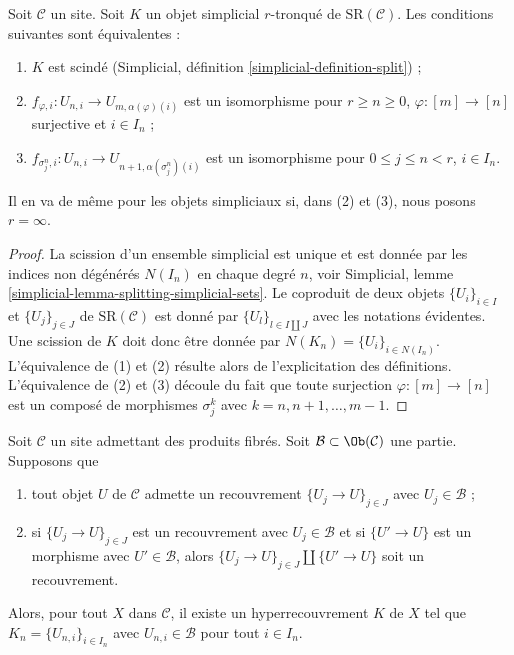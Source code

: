 \begin{lemma}
\label{lemma-split}
Soit $\mathcal{C}$ un site. Soit $K$ un objet simplicial $r$-tronqué
de $\text{SR}(\mathcal{C})$. Les conditions suivantes sont équivalentes :
\begin{enumerate}
\item $K$ est scindé (Simplicial, définition \ref{simplicial-definition-split}) ;
\item $f_{\varphi, i} : U_{n, i} \to U_{m, \alpha(\varphi)(i)}$
est un isomorphisme pour $r \geq n \geq 0$,
$\varphi : [m] \to [n]$ surjective et $i \in I_n$ ;
\item $f_{\sigma^n_j, i} : U_{n, i} \to U_{n + 1, \alpha(\sigma^n_j)(i)}$
est un isomorphisme pour $0 \leq j \leq n < r$, $i \in I_n$.
\end{enumerate}
Il en va de même pour les objets simpliciaux si, dans (2) et (3),
nous posons $r = \infty$.
\end{lemma}

\begin{proof}
La scission d'un ensemble simplicial est unique et est donnée par
les indices non dégénérés $N(I_n)$ en chaque degré $n$, voir
Simplicial, lemme \ref{simplicial-lemma-splitting-simplicial-sets}.
Le coproduit de deux objets $\{U_i\}_{i \in I}$ et $\{U_j\}_{j \in J}$
de $\text{SR}(\mathcal{C})$ est donné par $\{U_l\}_{l \in I \amalg J}$
avec les notations évidentes. Une scission de $K$ doit donc être donnée par
$N(K_n) = \{U_i\}_{i \in N(I_n)}$. L'équivalence de (1) et (2)
résulte alors de l'explicitation des définitions. L'équivalence de (2)
et (3) découle du fait que toute surjection
$\varphi : [m] \to [n]$ est un composé de morphismes
$\sigma^k_j$ avec $k = n, n + 1, \ldots, m - 1$.
\end{proof}

\begin{lemma}
\label{lemma-hypercovering-object}
Soit $\mathcal{C}$ un site admettant des produits fibrés.
Soit $\mathcal{B} \subset \Ob(\mathcal{C})$ une partie.
Supposons que
\begin{enumerate}
\item tout objet $U$ de $\mathcal{C}$ admette un recouvrement
$\{U_j \to U\}_{j \in J}$ avec $U_j \in \mathcal{B}$ ;
\item si $\{U_j \to U\}_{j \in J}$ est un recouvrement
avec $U_j \in \mathcal{B}$ et si $\{U' \to U\}$ est un morphisme avec
$U' \in \mathcal{B}$, alors $\{U_j \to U\}_{j \in J} \amalg \{U' \to U\}$
soit un recouvrement.
\end{enumerate}
Alors, pour tout $X$ dans $\mathcal{C}$, il existe un hyperrecouvrement $K$
de $X$ tel que $K_n = \{U_{n, i}\}_{i \in I_n}$
avec $U_{n, i} \in \mathcal{B}$ pour tout $i \in I_n$.
\end{lemma}

